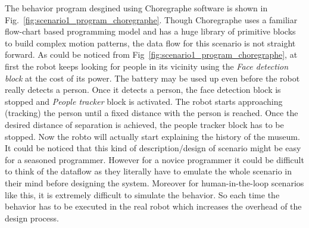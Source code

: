 The behavior program desgined using Choregraphe software is shown in Fig.~\ref{fig:scenario1_program_choregraphe}. Though Choregraphe uses a familiar flow-chart based programming model and has a huge library of primitive blocks to build complex motion patterns, the data flow for this scenario is not straight forward. As could be noticed from Fig~\ref{fig:scenario1_program_choregraphe}, at first the robot keeps looking for people in its vicinity using the \emph{Face detection block} at the cost of its power. The battery may be used up even before the robot really detects a person. Once it detects a person, the face detection block is stopped and \emph{People tracker} block is activated. The robot starts approaching (tracking) the person until a fixed distance with the person is reached. Once the desired distance of separation is achieved, the people tracker block has to be stopped. Now the robto will actually start explaining the history of the museum. It could be noticed that this kind of description/design of scenario might be easy for a seasoned programmer. However for a novice programmer it could be difficult to think of the dataflow as they literally have to emulate the whole scenario in their mind before designing the system. Moreover for human-in-the-loop scenarios like this, it is extremely difficult to simulate the behavior. So each time the behavior has to be executed in the real robot which increases the overhead of the design process.

